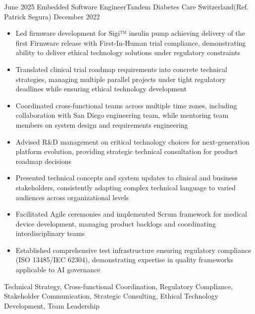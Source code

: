 %
%
%
\begin{experiences}
  \experience
    {June 2025}   {Embedded Software Engineer}{Tandem Diabetes Care Switzerland}{(Ref. Patrick Segura)}
    {December 2022} {
                      \begin{itemize}
                       \item Led firmware development for Sigi™ insulin pump achieving delivery of the first Firmware release with First-In-Human trial compliance, demonstrating ability to deliver ethical technology solutions under regulatory constraints
                       \item Translated clinical trial roadmap requirements into concrete technical strategies, managing multiple parallel projects under tight regulatory deadlines while ensuring ethical technology development
                       \item Coordinated cross-functional teams across multiple time zones, including collaboration with San Diego engineering team, while mentoring team members on system design and requirements engineering
                       \item Advised R\&D management on critical technology choices for next-generation platform evolution, providing strategic technical consultation for product roadmap decisions
                       \item Presented technical concepts and system updates to clinical and business stakeholders, consistently adapting complex technical language to varied audiences across organizational levels
                       \item Facilitated Agile ceremonies and implemented Scrum framework for medical device development, managing product backlogs and coordinating interdisciplinary teams
                       \item Established comprehensive test infrastructure ensuring regulatory compliance (ISO 13485/IEC 62304), demonstrating expertise in quality frameworks applicable to AI governance
                      \end{itemize}
                    }
                {Technical Strategy, Cross-functional Coordination, Regulatory Compliance, Stakeholder Communication, Strategic Consulting, Ethical Technology Development, Team Leadership}

\end{experiences}
